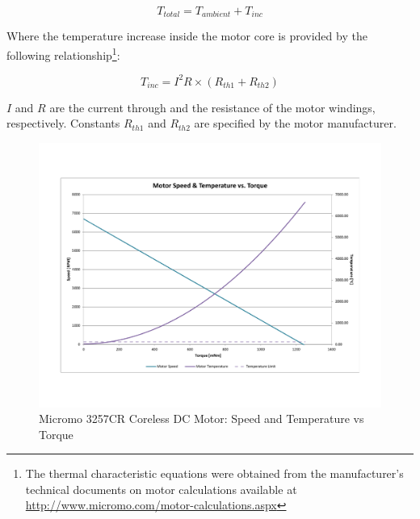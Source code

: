 \begin{equation}
	T_{total} = T_{ambient} + T_{inc}
\end{equation}

Where the temperature increase inside the motor core is provided by the following relationship\footnote{The thermal characteristic equations were obtained from the manufacturer's technical documents on motor calculations available at \url{http://www.micromo.com/motor-calculations.aspx}}: 

\begin{equation}
	T_{inc} = I^{2}R \times (R_{th1} + R_{th2})
\end{equation}

$I$ and $R$ are the current through and the resistance of the motor windings, respectively. Constants $R_{th1}$ and $R_{th2}$ are specified by the motor manufacturer. 


\begin{figure}[!ht]
	\begin{center}
    \includegraphics[trim = 20mm 30mm 20mm 30mm,clip,width=15cm]{fig/design/motor3.pdf}
	\end{center}
  \caption{Micromo 3257CR Coreless DC Motor: Speed and Temperature vs Torque}
\end{figure}

